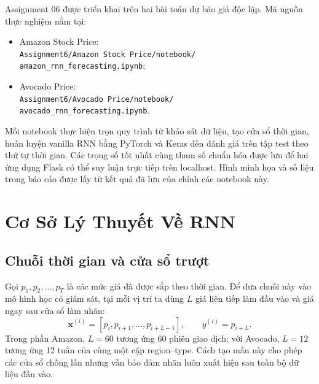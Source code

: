 \documentclass[12pt,a4paper]{report}
\newcommand{\modelpath}[1]{\texttt{#1}}
\begin{document}
\vspace{0.4cm}
\noindent Assignment 06 được triển khai trên hai bài toán dự báo giá độc lập. Mã nguồn thực nghiệm nằm tại:
\begin{itemize}
    \item Amazon Stock Price:\\
    \modelpath{Assignment6/Amazon Stock Price/notebook/}\\
    \modelpath{amazon\_rnn\_forecasting.ipynb};
    \item Avocado Price:\\
    \modelpath{Assignment6/Avocado Price/notebook/}\\
    \modelpath{avocado\_rnn\_forecasting.ipynb}.
\end{itemize}

Mỗi notebook thực hiện trọn quy trình từ khảo sát dữ liệu, tạo cửa sổ thời gian, huấn luyện vanilla RNN
bằng PyTorch và Keras đến đánh giá trên tập test theo thứ tự thời gian. Các trọng số tốt nhất cùng tham số
chuẩn hóa được lưu để hai ứng dụng Flask có thể suy luận trực tiếp trên localhost. Hình minh họa và số liệu
trong báo cáo được lấy từ kết quả đã lưu của chính các notebook này.
\newpage

\chapter{Cơ Sở Lý Thuyết Về RNN}

\section{Chuỗi thời gian và cửa sổ trượt}
Gọi $p_1,p_2,\ldots,p_T$ là các mức giá đã được sắp theo thời gian. Để đưa chuỗi này vào mô hình học
có giám sát, tại mỗi vị trí ta dùng $L$ giá liên tiếp làm đầu vào và giá ngay sau cửa sổ làm nhãn:
\begin{equation}
    \mathbf{x}^{(i)}=[p_i,p_{i+1},\ldots,p_{i+L-1}],\qquad
    y^{(i)}=p_{i+L}.
\end{equation}
Trong phần Amazon, $L=60$ tương ứng 60 phiên giao dịch; với Avocado, $L=12$ tương ứng 12 tuần của
cùng một cặp region--type. Cách tạo mẫu này cho phép các cửa sổ chồng lấn nhưng vẫn bảo đảm nhãn luôn
xuất hiện sau toàn bộ dữ liệu đầu vào.
\end{document}
